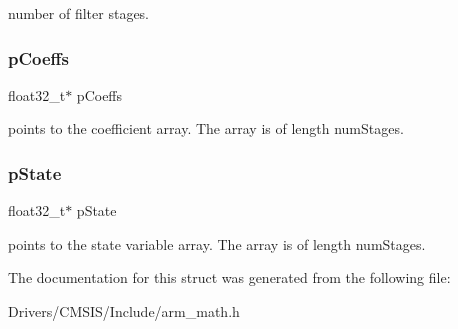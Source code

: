 number of filter stages. \mbox{\label{structarm__fir__lattice__instance__f32_aacbb8dd8eeba4b21fc2bb40076405ee3}} 
\subsubsection{\texorpdfstring{p\+Coeffs}{pCoeffs}}
{\footnotesize\ttfamily float32\+\_\+t$\ast$ p\+Coeffs}

points to the coefficient array. The array is of length num\+Stages. \mbox{\label{structarm__fir__lattice__instance__f32_a335c87e6fdc4b96601d95a5de8b9c463}} 
\subsubsection{\texorpdfstring{p\+State}{pState}}
{\footnotesize\ttfamily float32\+\_\+t$\ast$ p\+State}

points to the state variable array. The array is of length num\+Stages. 

The documentation for this struct was generated from the following file\+:\begin{DoxyCompactItemize}
\item 
Drivers/\+C\+M\+S\+I\+S/\+Include/arm\+\_\+math.\+h\end{DoxyCompactItemize}
